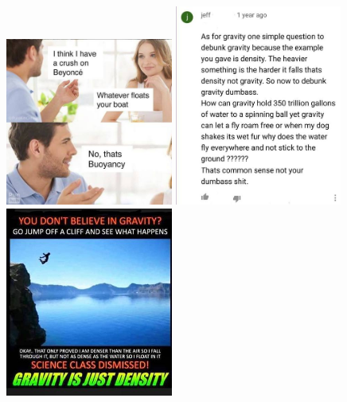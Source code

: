 
\includegraphics[width=5.5cm]{images/gravity_stupid/stupid1}
\includegraphics[width=5.5cm]{images/gravity_stupid/stupid2}
\includegraphics[width=5.5cm]{images/gravity_stupid/stupid4}

